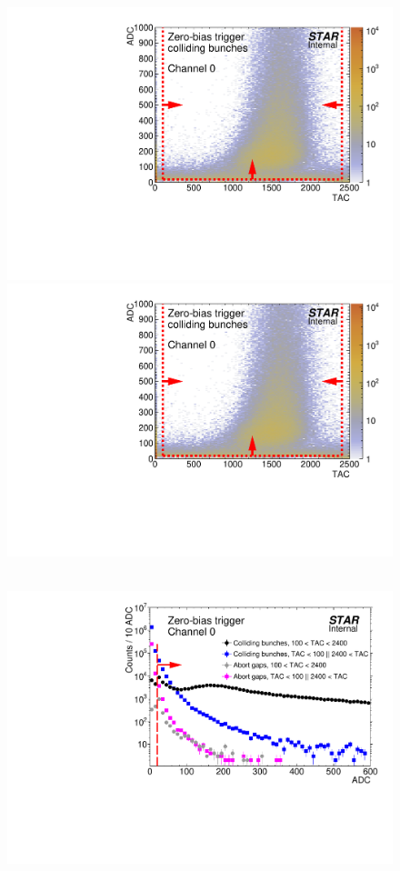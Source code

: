 \begin{figure}[hb]
{  \includegraphics[width=\linewidth,page=20]{graphics/eventSelection/bbc/Bbc_ADCvsTAC_collidingBunches.pdf}\\
  \includegraphics[width=\linewidth,page=21]{graphics/eventSelection/bbc/Bbc_ADCvsTAC_collidingBunches.pdf}
}~
\parbox{0.327\textwidth}{
  \centering
  \includegraphics[width=\linewidth,page=17]{graphics/eventSelection/bbc/Bbc_ADC.pdf}\\
}
\end{figure}
